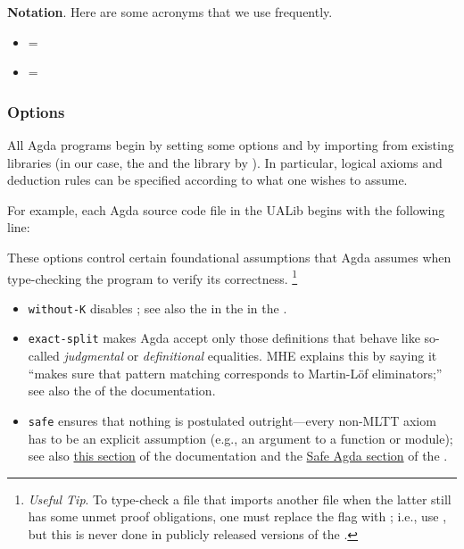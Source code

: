 
\textbf{Notation}. Here are some acronyms that we use frequently.

\begin{itemize}
\tightlist
\item \mhe = \MHE
\item \mltt = \MLTT
\end{itemize}

\subsubsection{Options}\label{options}
All Agda programs begin by setting some options and by importing from existing libraries (in our case, the \agdastdlib and the \TypeTopology library by \mhe). In particular, logical axioms and deduction rules can be specified according to what one wishes to assume.

For example, each Agda source code file in the UALib begins with the following line:
\ccpad
\begin{code}%
\>[0]\AgdaSymbol{\{-\#}\AgdaSpace{}%
\AgdaSpace{}%
\AgdaSpace{}%
\AgdaSpace{}%
\AgdaSpace{}%
\AgdaSymbol{\#-\}}\<%
\end{code}
\ccpad
These options control certain foundational assumptions that Agda assumes when type-checking the program to verify its correctness.%
\footnote{\emph{Useful Tip}. To type-check a file that imports another file when the latter still has some unmet proof obligations, one must replace the  flag with ; i.e., use
\AgdaSymbol{\{-\#}\AgdaSpace{}%
\AgdaSpace{}%
\AgdaSpace{}%
\AgdaSpace{}%
\AgdaSpace{}%
\AgdaSymbol{\#-\}}, but this is never done in publicly released versions of the \ualib.}

\begin{itemize}
\item
  \texttt{without-K} disables \axiomk; see also the in the \agdarefk in the \agdaref.
\item
  \texttt{exact-split} makes Agda accept only those definitions that
  behave like so-called \emph{judgmental} or \emph{definitional}
  equalities. MHE explains this by saying it ``makes sure that pattern
  matching corresponds to Martin-Löf eliminators;'' see also the
  \patternmatching of the \agdatools documentation.
\item
  \texttt{safe} ensures that nothing is postulated outright---every non-MLTT axiom has to be an explicit assumption (e.g., an argument to a function or module); see also \href{https://agda.readthedocs.io/en/v2.6.1/tools/command-line-options.html\#cmdoption-safe}{this section} of the \agdatools documentation and the \href{https://agda.readthedocs.io/en/v2.6.1/language/safe-agda.html\#safe-agda}{Safe Agda section} of the \agdaref.
\end{itemize}


